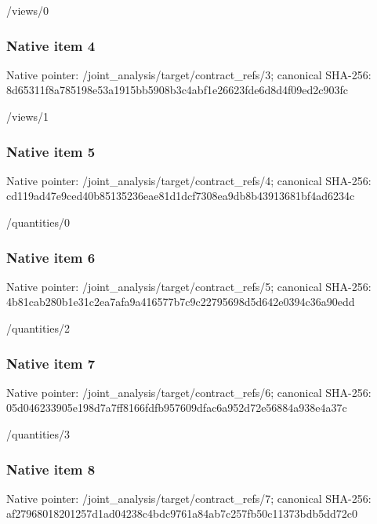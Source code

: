 \documentclass[10pt,a4paper]{article}
\begin{document}
\begingroup\raggedright\sloppy /\allowbreak{}views/\allowbreak{}0\par\endgroup

\subsubsection{Native item 4}
Native pointer: /joint\_\allowbreak{}analysis/target/contract\_\allowbreak{}refs/3; canonical SHA-256: 8d65311f8a785198e53a1915bb5908b3c4abf1e26623fde6d8d4f09ed2c903fc

\begingroup\raggedright\sloppy /\allowbreak{}views/\allowbreak{}1\par\endgroup

\subsubsection{Native item 5}
Native pointer: /joint\_\allowbreak{}analysis/target/contract\_\allowbreak{}refs/4; canonical SHA-256: cd119ad47e9ced40b85135236eae81d1dcf7308ea9db8b43913681bf4ad6234c

\begingroup\raggedright\sloppy /\allowbreak{}quantities/\allowbreak{}0\par\endgroup

\subsubsection{Native item 6}
Native pointer: /joint\_\allowbreak{}analysis/target/contract\_\allowbreak{}refs/5; canonical SHA-256: 4b81cab280b1e31c2ea7afa9a416577b7c9c22795698d5d642e0394c36a90edd

\begingroup\raggedright\sloppy /\allowbreak{}quantities/\allowbreak{}2\par\endgroup

\subsubsection{Native item 7}
Native pointer: /joint\_\allowbreak{}analysis/target/contract\_\allowbreak{}refs/6; canonical SHA-256: 05d046233905e198d7a7ff8166fdfb957609dfac6a952d72e56884a938e4a37c

\begingroup\raggedright\sloppy /\allowbreak{}quantities/\allowbreak{}3\par\endgroup

\subsubsection{Native item 8}
Native pointer: /joint\_\allowbreak{}analysis/target/contract\_\allowbreak{}refs/7; canonical SHA-256: af27968018201257d1ad04238c4bdc9761a84ab7c257fb50c11373bdb5dd72c0
\end{document}
